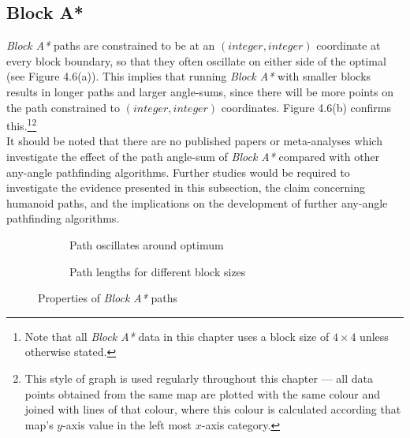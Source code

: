 \documentclass[12pt,notitlepage]{report}
\begin{document}
\subsection{Block A*}
{\em Block A*} paths are constrained to be at an $(integer,integer)$ coordinate at every block boundary, so that they often oscillate on either side of the optimal (see Figure 4.6(a)). This implies that running {\em Block A*} with smaller blocks results in longer paths and larger angle-sums, since there will be more points on the path constrained to $(integer,integer)$ coordinates. Figure 4.6(b) confirms this.\footnote{Note that all {\em Block A*} data in this chapter uses a block size of $4 \times 4$ unless otherwise stated.}\footnote{This style of graph is used regularly throughout this chapter --- all data points obtained from the same map are plotted with the same colour and joined with lines of that colour, where this colour is calculated according that map's $y$-axis value in the left most $x$-axis category.}\\

\noindent
It should be noted that there are no published papers or meta-analyses which investigate the effect of the path angle-sum of {\em Block A*} compared with other any-angle pathfinding algorithms. Further studies would be required to investigate the evidence presented in this subsection, the claim concerning humanoid paths, and the implications on the development of further any-angle pathfinding algorithms.

\begin{figure}
\centering
  \begin{subfigure}[b]{0.49\textwidth}
  \centering
  \caption{Path oscillates around optimum}
  \end{subfigure}
  \begin{subfigure}[b]{0.49\textwidth}
  \centering
  
  \caption{Path lengths for different block sizes}
  \end{subfigure}
\caption[Properties of Block A* paths]{Properties of {\em Block A*} paths}
\end{figure}
\end{document}
